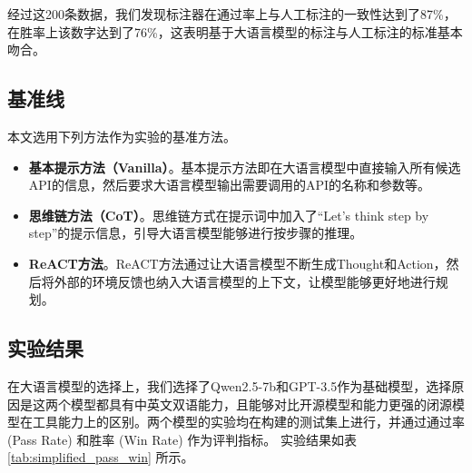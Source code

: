   \noindent

经过这200条数据，我们发现标注器在通过率上与人工标注的一致性达到了87\%，在胜率上该数字达到了76\%，这表明基于大语言模型的标注与人工标注的标准基本吻合。

\subsection{基准线}

本文选用下列方法作为实验的基准方法。

\begin{itemize}
  \item  \textbf{基本提示方法（Vanilla）}。基本提示方法即在大语言模型中直接输入所有候选API的信息，然后要求大语言模型输出需要调用的API的名称和参数等。
  \item  \textbf{思维链方法（CoT）}\cite{Wang2023a}。思维链方式在提示词中加入了“Let's think step by step”的提示信息，引导大语言模型能够进行按步骤的推理。
  \item  \textbf{ReACT方法}\cite{Yao2023b}。ReACT方法通过让大语言模型不断生成Thought和Action，然后将外部的环境反馈也纳入大语言模型的上下文，让模型能够更好地进行规划。
\end{itemize}
\indent

\subsection{实验结果}

在大语言模型的选择上，我们选择了Qwen2.5-7b和GPT-3.5作为基础模型，选择原因是这两个模型都具有中英文双语能力，且能够对比开源模型和能力更强的闭源模型在工具能力上的区别。两个模型的实验均在构建的测试集上进行，并通过通过率 (Pass Rate) 和胜率 (Win Rate) 作为评判指标。
实验结果如表 \ref{tab:simplified_pass_win} 所示。

